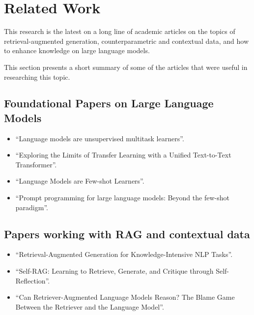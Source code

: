 \section{Related Work}

This research is the latest on a long line of academic articles on the topics of retrieval-augmented generation, counterparametric and contextual data, and how to enhance knowledge on large language models.

This section presents a short summary of some of the articles that were useful in researching this topic.


\subsection{Foundational Papers on Large Language Models}
\begin{itemize}
	\item ``Language models are unsupervised multitask learners''\cite{gpt2}.
	\item ``Exploring the Limits of Transfer Learning with a Unified Text-to-Text Transformer''\cite{t5}.
	\item ``Language Models are Few-shot Learners''\cite{fewshotlearners}.
	\item ``Prompt programming for large language models: Beyond the few-shot paradigm''\cite{beyondfewshot}.
\end{itemize}

\subsection{Papers working with RAG and contextual data}
\begin{itemize}
	\item ``Retrieval-Augmented Generation for Knowledge-Intensive NLP Tasks''\cite{rag}.
	\item ``Self-RAG: Learning to Retrieve, Generate, and Critique through Self-Reflection''\cite{selfrag}.
	\item ``Can Retriever-Augmented Language Models Reason? The Blame Game Between the Retriever and the Language Model''\cite{can_rag_models_reason}.
\end{itemize}

